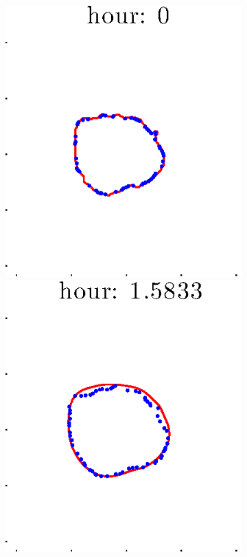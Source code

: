 \documentclass[12pt]{article}
\begin{document}
\begin{figure}[h!]
\begin{subfigure}[b]{.3\textwidth}
	\end{subfigure}
	\begin{subfigure}[b]{.3\textwidth}
	\centering
		\includegraphics[height=.15\textheight]{Pos5exp2/full/first1.eps}
		\includegraphics[height=.15\textheight]{Pos5exp2/full/first2.eps}

\end{subfigure}
\end{figure}
\end{document}
